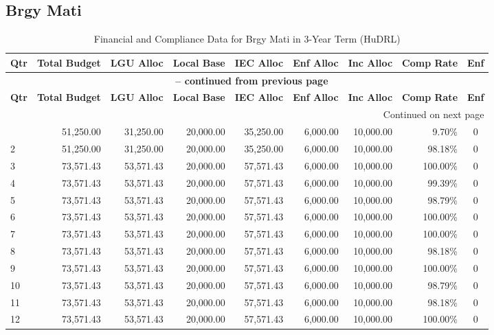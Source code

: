 \subsection{Brgy Mati}
\begin{longtable}{lrrrrrrrc}
\caption{Financial and Compliance Data for Brgy Mati in 3-Year Term (HuDRL)} \\
\toprule
\textbf{Qtr} & \textbf{Total Budget} & \textbf{LGU Alloc} & \textbf{Local Base} & \textbf{IEC Alloc} & \textbf{Enf Alloc} & \textbf{Inc Alloc} & \textbf{Comp Rate} & \textbf{Enf} \\
\midrule
\endfirsthead
\multicolumn{9}{c}{{\bfseries \tablename\ \thetable{} -- continued from previous page}} \\
\toprule
\textbf{Qtr} & \textbf{Total Budget} & \textbf{LGU Alloc} & \textbf{Local Base} & \textbf{IEC Alloc} & \textbf{Enf Alloc} & \textbf{Inc Alloc} & \textbf{Comp Rate} & \textbf{Enf} \\
\midrule
\endhead
\hline \multicolumn{9}{r}{{Continued on next page}} \\ \hline
\endfoot
\bottomrule
\endlastfoot
1 & 51,250.00 & 31,250.00 & 20,000.00 & 35,250.00 & 6,000.00 & 10,000.00 & 9.70\% & 0 \\
2 & 51,250.00 & 31,250.00 & 20,000.00 & 35,250.00 & 6,000.00 & 10,000.00 & 98.18\% & 0 \\
3 & 73,571.43 & 53,571.43 & 20,000.00 & 57,571.43 & 6,000.00 & 10,000.00 & 100.00\% & 0 \\
4 & 73,571.43 & 53,571.43 & 20,000.00 & 57,571.43 & 6,000.00 & 10,000.00 & 99.39\% & 0 \\
5 & 73,571.43 & 53,571.43 & 20,000.00 & 57,571.43 & 6,000.00 & 10,000.00 & 98.79\% & 0 \\
6 & 73,571.43 & 53,571.43 & 20,000.00 & 57,571.43 & 6,000.00 & 10,000.00 & 100.00\% & 0 \\
7 & 73,571.43 & 53,571.43 & 20,000.00 & 57,571.43 & 6,000.00 & 10,000.00 & 100.00\% & 0 \\
8 & 73,571.43 & 53,571.43 & 20,000.00 & 57,571.43 & 6,000.00 & 10,000.00 & 98.18\% & 0 \\
9 & 73,571.43 & 53,571.43 & 20,000.00 & 57,571.43 & 6,000.00 & 10,000.00 & 100.00\% & 0 \\
10 & 73,571.43 & 53,571.43 & 20,000.00 & 57,571.43 & 6,000.00 & 10,000.00 & 98.79\% & 0 \\
11 & 73,571.43 & 53,571.43 & 20,000.00 & 57,571.43 & 6,000.00 & 10,000.00 & 98.18\% & 0 \\
12 & 73,571.43 & 53,571.43 & 20,000.00 & 57,571.43 & 6,000.00 & 10,000.00 & 100.00\% & 0 \\
\end{longtable}